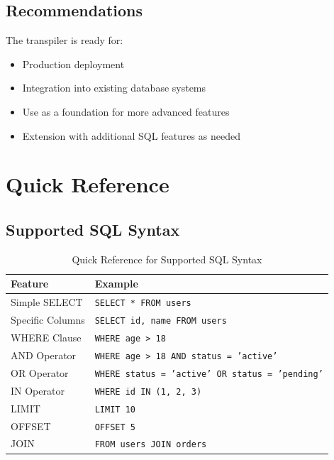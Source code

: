 \documentclass[12pt,a4paper]{article}
\begin{document}
\subsection{Recommendations}

The transpiler is ready for:
\begin{itemize}
    \item Production deployment
    \item Integration into existing database systems
    \item Use as a foundation for more advanced features
    \item Extension with additional SQL features as needed
\end{itemize}

\newpage

\appendix

\section{Quick Reference}

\subsection{Supported SQL Syntax}

\begin{table}[H]
    \centering
    \begin{tabular}{|l|l|}
        \hline
        \textbf{Feature} & \textbf{Example} \\
        \hline
        Simple SELECT & \texttt{SELECT * FROM users} \\
        Specific Columns & \texttt{SELECT id, name FROM users} \\
        WHERE Clause & \texttt{WHERE age > 18} \\
        AND Operator & \texttt{WHERE age > 18 AND status = 'active'} \\
        OR Operator & \texttt{WHERE status = 'active' OR status = 'pending'} \\
        IN Operator & \texttt{WHERE id IN (1, 2, 3)} \\
        LIMIT & \texttt{LIMIT 10} \\
        OFFSET & \texttt{OFFSET 5} \\
        JOIN & \texttt{FROM users JOIN orders} \\
        \hline
    \end{tabular}
    \caption{Quick Reference for Supported SQL Syntax}
    \label{tab:quick-ref}
\end{table}
\end{document}
